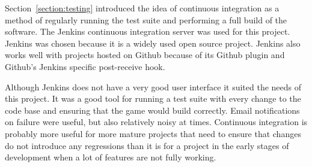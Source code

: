 Section~\ref{section:testing} introduced the idea of continuous integration as a method
of regularly running the test suite and performing a full build of the software.
The Jenkins continuous integration server
was used for this project. Jenkins was chosen because it is a widely used open
source project.
Jenkins also works well with projects hosted on Github because of its Github plugin
and Github's Jenkins specific post-receive hook.

Although Jenkins does not have a very good user interface it suited the needs of
this project. It was a good tool for running a test suite with every change to the
code base and ensuring that the game would build correctly. Email notifications on failure
were useful, but also relatively noisy at times. Continuous integration is probably
more useful for more mature projects that need to ensure that changes do not introduce
any regressions than it is for a project in the early stages of development when a lot
of features are not fully working.
